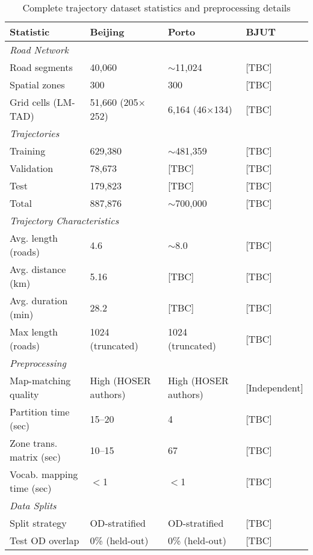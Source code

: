 \begin{table}[H]
\centering
\caption{Complete trajectory dataset statistics and preprocessing details}
\label{tab:dataset-stats-appendix}
\small
\begin{tabular}{llll}
\toprule
\textbf{Statistic} & \textbf{Beijing} & \textbf{Porto} & \textbf{BJUT} \\
\midrule
\multicolumn{4}{l}{\textit{Road Network}} \\
\quad Road segments & 40,060 & $\sim$11,024 & [TBC] \\
\quad Spatial zones & 300 & 300 & [TBC] \\
\quad Grid cells (LM-TAD) & 51,660 (205$\times$252) & 6,164 (46$\times$134) & [TBC] \\
\midrule
\multicolumn{4}{l}{\textit{Trajectories}} \\
\quad Training & 629,380 & $\sim$481,359 & [TBC] \\
\quad Validation & 78,673 & [TBC] & [TBC] \\
\quad Test & 179,823 & [TBC] & [TBC] \\
\quad Total & 887,876 & $\sim$700,000 & [TBC] \\
\midrule
\multicolumn{4}{l}{\textit{Trajectory Characteristics}} \\
\quad Avg. length (roads) & 4.6 & $\sim$8.0 & [TBC] \\
\quad Avg. distance (km) & 5.16 & [TBC] & [TBC] \\
\quad Avg. duration (min) & 28.2 & [TBC] & [TBC] \\
\quad Max length (roads) & 1024 (truncated) & 1024 (truncated) & [TBC] \\
\midrule
\multicolumn{4}{l}{\textit{Preprocessing}} \\
\quad Map-matching quality & High (HOSER authors) & High (HOSER authors) & [Independent] \\
\quad Partition time (sec) & 15--20 & 4 & [TBC] \\
\quad Zone trans. matrix (sec) & 10--15 & 67 & [TBC] \\
\quad Vocab. mapping time (sec) & $<$1 & $<$1 & [TBC] \\
\midrule
\multicolumn{4}{l}{\textit{Data Splits}} \\
\quad Split strategy & OD-stratified & OD-stratified & [TBC] \\
\quad Test OD overlap & 0\% (held-out) & 0\% (held-out) & [TBC] \\
\bottomrule
\end{tabular}
\end{table}

